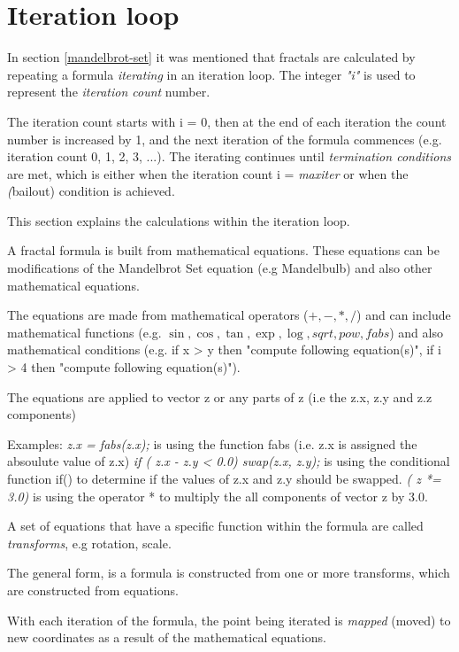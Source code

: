 \section{Iteration loop}\label{iteration-loop}

In section \ref{mandelbrot-set} it was mentioned that fractals are calculated
by repeating a formula \emph{iterating} in an iteration loop. 
The integer \emph{"i"} is used to represent the \emph{iteration count} number.

The iteration count starts with i = 0, then at the end of each iteration the
count number is increased by 1, and the next iteration of the formula commences 
(e.g. iteration count  0, 1, 2, 3, ...). The iterating continues until \emph{termination conditions} are met, 
which is either when the iteration count i =  \emph{maxiter} or when the \emph({bailout}) condition is achieved. 

This section explains the calculations within the iteration loop.

A fractal formula is built from mathematical equations. 
These equations can be modifications of the Mandelbrot Set equation (e.g Mandelbulb) and also other mathematical equations.

The equations are made from mathematical operators ($+, -, *, /$) 
and can include mathematical functions (e.g. $\sin, \cos, \tan, \exp, \log, sqrt, pow, fabs$) 
and also mathematical conditions (e.g. if x > y then "compute following equation(s)", if i > 4 then "compute following equation(s)").

The equations are applied to vector z or any parts of z (i.e the z.x, z.y and z.z components)

Examples:
\emph{z.x = fabs(z.x);} is using the function fabs (i.e. z.x is assigned the absoulute value of z.x)
\emph{if ( z.x - z.y < 0.0) swap(z.x, z.y);} is using the conditional function if() to determine if the values of z.x and z.y should be swapped.
\emph{( z *= 3.0)} is using the operator * to multiply the all components of vector z by 3.0.

A set of equations that have a specific function within the formula are called \emph{transforms}, e.g rotation, scale.

The general form, is a formula is constructed from one or more transforms, which are constructed from equations.

With each iteration of the formula, the point being iterated is \emph{mapped} (moved) to new coordinates as a result of the mathematical equations.  

